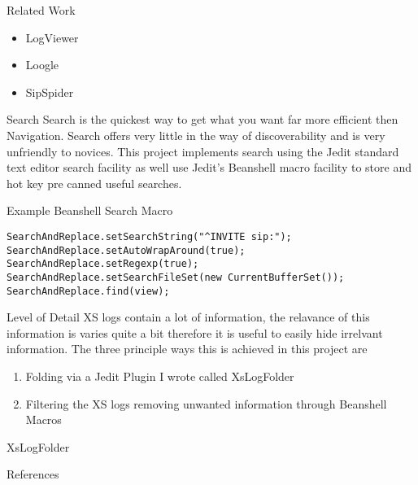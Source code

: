 \documentclass{beamer}
\begin{document}
\begin{frame}{Related Work}

\begin{itemize}
\item LogViewer
\item Loogle\cite{Loogle}
\item SipSpider
\end{itemize}

\end{frame}


\begin{frame}{Search}
Search is the quickest way to get what you want far more efficient then Navigation. Search offers very little in the way of discoverability and is very unfriendly to novices. This project implements search using the Jedit\cite{Jedit} standard text editor search facility as well use Jedit's Beanshell\cite{Beanshell} macro facility to store and hot key pre canned useful searches. 
\end{frame}

\begin{frame}{Example Beanshell Search Macro}
\begin{lstlisting}
SearchAndReplace.setSearchString("^INVITE sip:");
SearchAndReplace.setAutoWrapAround(true);
SearchAndReplace.setRegexp(true);
SearchAndReplace.setSearchFileSet(new CurrentBufferSet());
SearchAndReplace.find(view);
\end{lstlisting}
\end{frame}

\begin{frame}{Level of Detail}
XS logs contain a lot of information, the relavance of this information is varies quite a bit therefore it is useful to easily hide irrelvant information. The three principle ways this is achieved in this project are 

\begin{enumerate}
\item Folding via a Jedit Plugin I wrote called XsLogFolder\cite{XSLogFolder} 
\item Filtering the XS logs removing unwanted information through Beanshell Macros
\end{enumerate}

XsLogFolder\cite{XsLogFolder}
\end{frame}






\begin{frame}[allowframebreaks]{References}


\end{frame}
\end{document}
